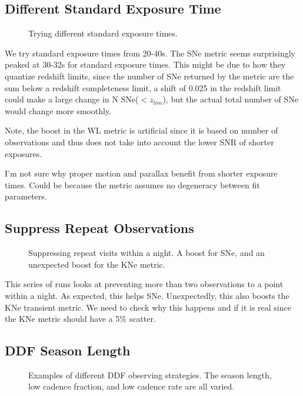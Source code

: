 \subsection{Different Standard Exposure Time}


\begin{figure}
\caption{Trying different standard exposure times.  }
\end{figure}


We try standard exposure times from 20-40s.  The SNe metric seems surprisingly peaked at 30-32s for standard exposure times. This might be due to how they quantize redshift limits, since the number of SNe returned by the metric are the sum below a redshift completeness limit, a shift of 0.025 in the redshift limit could make a large change in N SNe($<z_{lim}$), but the actual total number of SNe would change more smoothly. 

Note, the boost in the WL metric is artificial since it is based on number of observations and thus does not take into account the lower SNR of shorter exposures. 


I'm not sure why proper motion and parallax benefit from shorter exposure times. Could be because the metric assumes no degeneracy between fit parameters. 

\subsection{Suppress Repeat Observations}


\begin{figure}
\caption{Suppressing repeat visits within a night. A boost for SNe, and an unexpected boost for the KNe metric. }
\end{figure}


This series of runs looks at preventing more than two observations to a point within a night. As expected, this helps SNe. Unexpectedly, this also boosts the KNe transient metric. We need to check why this happens and if it is real since the KNe metric should have a 5\% scatter.


\subsection{DDF Season Length}

\begin{figure}
\caption{Examples of different DDF observing strategies. The season length, low cadence fraction, and low cadence rate are all varied. \label{fig:ddf_acourd}}
\end{figure}


